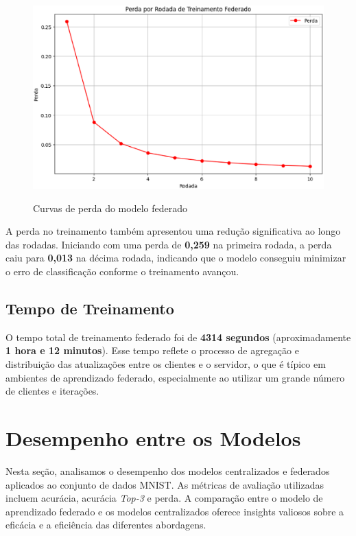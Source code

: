 \begin{figure}[ht]
    \centering
    \caption{Curvas de perda do modelo federado}
    \includegraphics[scale=0.4]{figuras/analiseResultados/lossFederated.eps}
    \label{fig:lossFederated}
\end{figure}

A perda no treinamento também apresentou uma redução significativa ao longo das rodadas. Iniciando com uma perda de \textbf{0,259} na primeira rodada, a perda caiu para \textbf{0,013} na décima rodada, indicando que o modelo conseguiu minimizar o erro de classificação conforme o treinamento avançou.

\subsection{Tempo de Treinamento}

O tempo total de treinamento federado foi de \textbf{4314 segundos} (aproximadamente \textbf{1 hora e 12 minutos}). Esse tempo reflete o processo de agregação e distribuição das atualizações entre os clientes e o servidor, o que é típico em ambientes de aprendizado federado, especialmente ao utilizar um grande número de clientes e iterações.

\section{Desempenho entre os Modelos}

Nesta seção, analisamos o desempenho dos modelos centralizados e federados aplicados ao conjunto de dados MNIST. As métricas de avaliação utilizadas incluem acurácia, acurácia \textit{Top-3} e perda. A comparação entre o modelo de aprendizado federado e os modelos centralizados oferece insights valiosos sobre a eficácia e a eficiência das diferentes abordagens.

